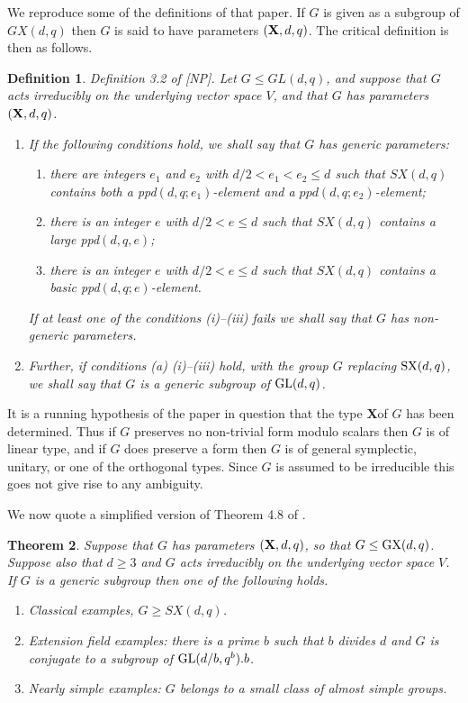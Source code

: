 \documentclass[12pt]{article}
\newtheorem{definition}{Definition}[section]
\newtheorem{theorem}[definition]{Theorem}
\def\X{{\bf X}}
\def\GL{{\rm GL}}
\def\SX{{\rm SX}}
\def\GX{{\rm GX}}
\begin{document}
We reproduce some of the definitions of that
paper.  
 If $G$ is given as a subgroup of
$GX(d,q)$ then $G$ is said to have parameters $(\X,d,q)$. The critical
definition is then as follows.

\begin{definition}
Definition 3.2 of [NP].  Let $G\le GL(d,q)$, and suppose that $G$
acts irreducibly on the underlying vector space $V$, and that $G$ has
parameters $(\X,d,q)$.
\begin{enumerate}
\item[(a)] If the following conditions hold, we shall say that $G$ has {\it generic
parameters}:
\begin{enumerate}
\item[ (i)] there are integers $e_1$ and $e_2$ with $d/2<e_1<e_2\le d$
such that $SX(d,q)$ contains both a ppd$(d,q;e_1)$-element and a
$ppd(d,q;e_2)$-element;
\item[(ii)] there is an integer $e$ with $d/2<e\le d$ such that $SX(d,q)$
contains a large ppd$(d,q,e)$;
\item[(iii)] there is an integer $e$ with $d/2<e\le d$ such that $SX(d,q)$
contains a basic ppd$(d,q;e)$-element.
\end{enumerate}
If at least one of the conditions (i)--(iii) fails we shall say that
$G$ has {\it non-generic parameters}.

\item[(b)] Further, if conditions (a) (i)--(iii) hold, with the group $G$
replacing $\SX(d,q)$, we shall say that $G$ is a {\it generic subgroup}
of $\GL(d,q)$.
\end{enumerate}

\end{definition}

It is a running hypothesis of the paper in question that the type \X of
$G$ has been determined.  Thus if $G$ preserves no non-trivial form
modulo scalars then $G$ is of linear type, and if $G$ does preserve a form then
$G$ is of general symplectic, unitary, or one of the orthogonal types.  Since
$G$ is assumed to be irreducible this goes not give rise to any
ambiguity.

We now quote a simplified version of Theorem 4.8 of \cite{NP}.

\begin{theorem}
Suppose that $G$ has parameters $(\X,d,q)$,
so that $G\le\GX(d,q)$.  Suppose also that $d\ge3$ and $G$ acts irreducibly
on the underlying vector space $V$.  If $G$ is a generic subgroup then one of 
the following holds.
\begin{enumerate}
\item[(a)] Classical examples, $G\ge SX(d,q)$.
\item[(b)] Extension field examples: there is a prime $b$ such that $b$ divides $d$
and $G$ is conjugate to a subgroup of $\GL(d/b,q^b).b$.
\item[(c)] Nearly simple examples: $G$ belongs to a small class of almost simple
groups.
\end{enumerate}
\end{theorem}
\end{document}
